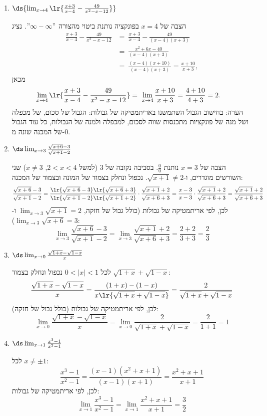 \begin{enumerate}
\item $\ds{ \lim_{x \to 4} \lr{\frac{x + 3}{x - 4}-\frac{49}{x^2 - x - 12}}}$
\ifsol
\begin{solbox}
הצבה של
$x=4$
בפונקציה נותנת ביטוי
מהצורה
$"\infty-\infty"$.
נציג
\begin{align*}
\frac{x + 3}{x - 4}-\frac{49}{x^2 - x - 12}&=\ \frac{x + 3}{x - 4}-\frac{49}{(x-4)(x+3)}\\
&=\ \frac{x^2+6x-40}{(x-4)(x+3)}\\
&=\ \frac{(x-4)(x+10)}{(x-4)(x+3)}
=\frac{x+10}{x+3},
\end{align*}
מכאן
\begin{align*}
    \lim_{x \to 4} \lr{\frac{x + 3}{x - 4}-\frac{49}{x^2 - x - 12}}&=\ \lim_{x \to 4}\frac{x+10}{x+3}
    = \frac{4+10}{4+3}
    = 2.
\end{align*}
הערה: בחישוב הגבול השתמשנו באריתמטיקה של גבולות: הגבול של סכום, של מכפלה ושל מנה של פונקציות מתכנסות שווה לסכום, למכפלה ולמנה של הגבולות, כל עוד הגבול של המכנה שונה מ-$0$.
\end{solbox}
\fi
\item $\ds\lim_{x\to3}\frac{\sqrt{x+6}-3}{\sqrt{x+1}-2}$
\ifsol
{}
\begin{solbox}
הצבה של $x=3$ נותנת $\frac00$. בסביבה נקובה של $3$ (למשל $2<x<4$, $x\ne3$) שני השורשים מוגדרים, ו-$\sqrt{x+1}\ne2$. נכפול ונחלק בצמוד של המונה ובצמוד של המכנה:
\[\frac{\sqrt{x+6}-3}{\sqrt{x+1}-2}
=\frac{\lr{\sqrt{x+6}-3}\lr{\sqrt{x+6}+3}}{\lr{\sqrt{x+1}-2}\lr{\sqrt{x+1}+2}}\cdot\frac{\sqrt{x+1}+2}{\sqrt{x+6}+3}
=\frac{x-3}{x-3}\cdot\frac{\sqrt{x+1}+2}{\sqrt{x+6}+3}
=\frac{\sqrt{x+1}+2}{\sqrt{x+6}+3}\]
לכן, לפי אריתמטיקה של גבולות (כולל גבול של חזקה, $\lim_{x\to3}\sqrt{x+1}=2$ ו-$\lim_{x\to3}\sqrt{x+6}=3$):
\[\lim_{x\to3}\frac{\sqrt{x+6}-3}{\sqrt{x+1}-2}=\lim_{x\to3}\frac{\sqrt{x+1}+2}{\sqrt{x+6}+3}=\frac{2+2}{3+3}=\frac23\]
\end{solbox}
\fi

\item $\ds\lim_{x\to0}\frac{\sqrt{1+x}-\sqrt{1-x}}{x}$
\ifsol
{}
\begin{solbox}
לכל $0<|x|<1$ נכפול ונחלק בצמוד $\sqrt{1+x}+\sqrt{1-x}$:
\[\frac{\sqrt{1+x}-\sqrt{1-x}}{x}=\frac{(1+x)-(1-x)}{x\lr{\sqrt{1+x}+\sqrt{1-x}}}=\frac{2}{\sqrt{1+x}+\sqrt{1-x}}\]
לכן, לפי אריתמטיקה של גבולות (כולל גבול של חזקה):
\[\lim_{x\to0}\frac{\sqrt{1+x}-\sqrt{1-x}}{x}=\lim_{x\to0}\frac{2}{\sqrt{1+x}+\sqrt{1-x}}=\frac{2}{1+1}=1\]
\end{solbox}
\fi

\item $\ds\lim_{x\to1}\frac{x^3-1}{x^2-1}$
\ifsol
{}
\begin{solbox}
לכל $x\ne\pm1$:
\[\frac{x^3-1}{x^2-1}=\frac{(x-1)(x^2+x+1)}{(x-1)(x+1)}=\frac{x^2+x+1}{x+1}\]
לכן, לפי אריתמטיקה של גבולות:
\[\lim_{x\to1}\frac{x^3-1}{x^2-1}=\lim_{x\to1}\frac{x^2+x+1}{x+1}=\frac32\]
\end{solbox}
\fi

\eMs
\end{enumerate}
